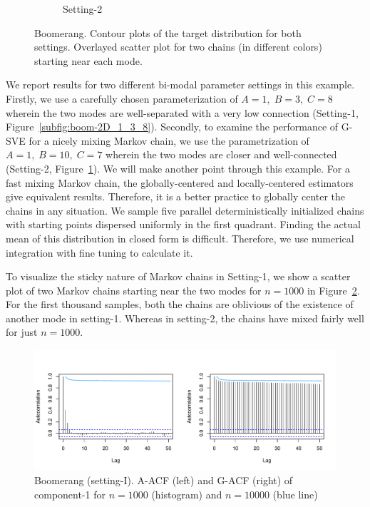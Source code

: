 \documentclass[11pt]{article}
\theoremstyle{remark}
\begin{document}
\begin{figure}[h]
\begin{subfigure}[h]{.45\textwidth}
        \caption{Setting-2}
        \label{subfig:boom-2D_1_10_7}
    \end{subfigure}
    \caption{Boomerang. Contour plots of the target distribution for both settings. Overlayed scatter plot for two chains (in different colors) starting near each mode.}
   \label{fig:boom-2D}
\end{figure}


We report results for two different bi-modal parameter settings in this example. Firstly, we use a carefully chosen parameterization of $A = 1,\; B = 3,\; C = 8$ wherein the two modes are well-separated with a very low connection (Setting-1, Figure~\ref{subfig:boom-2D_1_3_8}). Secondly, to examine the performance of G-SVE for a nicely mixing Markov chain, we use the parametrization of $A = 1, \; B = 10, \; C=7$ wherein the two modes are closer and well-connected (Setting-2, Figure~\ref{subfig:boom-2D_1_10_7}). We will make another point through this example. For a fast mixing Markov chain, the globally-centered and locally-centered estimators give equivalent results. Therefore, it is a better practice to globally center the chains in any situation. We sample five parallel deterministically initialized chains with starting points dispersed uniformly in the first quadrant. Finding the actual mean of this distribution in closed form is difficult. Therefore, we use numerical integration with fine tuning to calculate it.

 To visualize the sticky nature of Markov chains in Setting-1, we show a scatter plot of two Markov chains starting near the two modes for $n = 1000$ in Figure~\ref{fig:boom-2D}. For the first thousand samples, both the chains are oblivious of the existence of another mode in setting-1. Whereas in setting-2, the chains have mixed fairly well for just $n=1000$.
 
 
\begin{figure}[h]
    \centering
    \includegraphics[width = .9\textwidth]{plots/boom-acf_1_3_8.pdf}
    \caption{Boomerang (setting-I). A-ACF (left) and G-ACF (right) of component-1 for $n=1000$ (histogram) and $n=10000$ (blue line) }
    \label{fig:boom-acf_1_3_8}
\end{figure}
\end{document}
